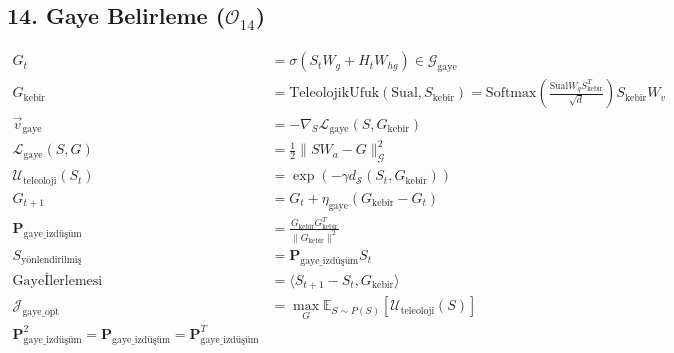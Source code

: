 \documentclass[11pt, a4paper]{article}
\begin{document}
\subsection{14. Gaye Belirleme ($\mathcal{O}_{14}$)}
\begin{align}
G_t &= \sigma(S_t W_g + H_t W_{hg}) \in \mathcal{G}_{\text{gaye}} \\
G_{\text{kebîr}} &= \text{TeleolojikUfuk}(\text{Sual}, S_{\text{kebîr}}) = \text{Softmax}\left( \frac{\text{Sual} W_q S_{\text{kebîr}}^T}{\sqrt{d}} \right) S_{\text{kebîr}} W_v \\
\vec{v}_{\text{gaye}} &= -\nabla_{S} \mathcal{L}_{\text{gaye}}(S, G_{\text{kebîr}}) \\
\mathcal{L}_{\text{gaye}}(S, G) &= \frac{1}{2} \|S W_a - G\|_{\mathcal{G}}^2 \\
\mathcal{U}_{\text{teleoloji}}(S_t) &= \exp\left( -\gamma d_{\mathcal{S}}(S_t, G_{\text{kebîr}}) \right) \\
G_{t+1} &= G_t + \eta_{\text{gaye}} (G_{\text{kebîr}} - G_t) \\
\mathbf{P}_{\text{gaye\_izdüşüm}} &= \frac{G_{\text{kebîr}} G_{\text{kebîr}}^T}{\|G_{\text{kebîr}}\|^2} \\
S_{\text{yönlendirilmiş}} &= \mathbf{P}_{\text{gaye\_izdüşüm}} S_t \\
\text{Gayeİlerlemesi} &= \langle S_{t+1} - S_t, G_{\text{kebîr}} \rangle \\
\mathcal{J}_{\text{gaye\_opt}} &= \max_{G} \mathbb{E}_{S \sim P(S)} [\mathcal{U}_{\text{teleoloji}}(S)] \\
\mathbf{P}_{\text{gaye\_izdüşüm}}^2 = \mathbf{P}_{\text{gaye\_izdüşüm}} = \mathbf{P}_{\text{gaye\_izdüşüm}}^T
\end{align}
\end{document}

